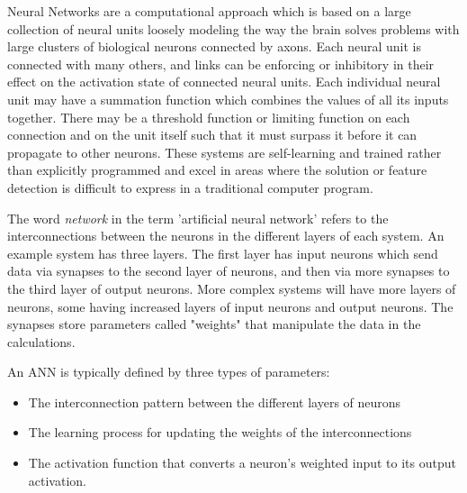 Neural Networks are a computational approach which is based on a large collection of neural units loosely modeling the way the brain solves problems with large clusters of biological neurons connected by axons. Each neural unit is connected with many others, and links can be enforcing or inhibitory in their effect on the activation state of connected neural units. Each individual neural unit may have a summation function which combines the values of all its inputs together. There may be a threshold function or limiting function on each connection and on the unit itself such that it must surpass it before it can propagate to other neurons. These systems are self-learning and trained rather than explicitly programmed and excel in areas where the solution or feature detection is difficult to express in a traditional computer program.

The word \textit{network} in the term 'artificial neural network' refers to the interconnections between the neurons in the different layers of each system. An example system has three layers. The first layer has input neurons which send data via synapses to the second layer of neurons, and then via more synapses to the third layer of output neurons. More complex systems will have more layers of neurons, some having increased layers of input neurons and output neurons. The synapses store parameters called "weights" that manipulate the data in the calculations.

An ANN is typically defined by three types of parameters:
\begin{itemize}
\item The interconnection pattern between the different layers of neurons
\item The learning process for updating the weights of the interconnections
\item The activation function that converts a neuron's weighted input to its output activation.
\end{itemize}
